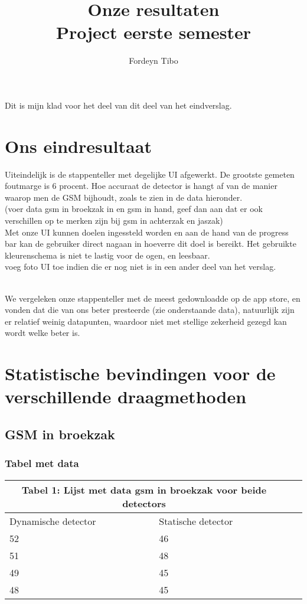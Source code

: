 \documentclass{report}
\title{\Huge{Onze resultaten}\\Project eerste semester}
\author{\huge{Fordeyn Tibo}}
\date{}
\begin{document}
\maketitle


\newpage%
\tableofcontents
\pagebreak

Dit is mijn klad voor het deel van dit deel van het eindverslag.
\chapter{Ons eindresultaat}
Uiteindelijk is de stappenteller met degelijke UI afgewerkt. De grootste gemeten foutmarge is 6 procent. Hoe accuraat de detector is hangt af van de manier waarop men de GSM bijhoudt, zoals te zien in de data hieronder.
\\ (voer data gsm in broekzak in en gsm in hand, geef dan aan dat er ook verschillen op te merken zijn bij gsm in achterzak en jaszak)
\\ Met onze UI kunnen doelen ingessteld worden en aan de hand van de progress bar kan de gebruiker direct nagaan in hoeverre dit doel is bereikt. Het gebruikte kleurenschema is niet te lastig voor de ogen, en leesbaar. 
\\ voeg foto UI toe indien die er nog niet is in een ander deel van het verslag.

\\ We vergeleken onze stappenteller met de meest gedownloadde op de app store, en vonden dat die van ons beter presteerde (zie onderstaande data), natuurlijk zijn er relatief weinig datapunten, waardoor niet met stellige zekerheid gezegd kan wordt welke beter is.




\chapter{Statistische bevindingen voor de verschillende draagmethoden}

\section{GSM in broekzak}
\subsection{Tabel met data}

\begin{tabular}{ |p{4cm}||p{4cm}|p{3cm}|p{3cm}|  }
 \hline
 \multicolumn{2}{|c|}{Tabel 1: Lijst met data gsm in broekzak voor beide detectors} \\
 \hline
 Dynamische detector& Statische detector \\
 \hline
 52   & 46   \\
 51&   48  \\
 49 &45 \\
 48&45 \\
 \hline
\end{tabular}
\end{document}
